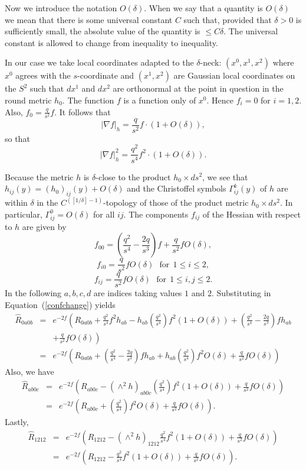 Now we introduce the notation $O(\delta)$. When we say that a
quantity is $O(\delta)$ we mean that there is some universal
constant $C$ such that, provided that $\delta>0$ is sufficiently
small, the absolute value of the quantity is $\le C\delta$. The
universal constant is allowed to change from inequality to
inequality.


In our case we take local coordinates adapted to the $\delta$-neck:
$(x^0,x^1,x^2)$ where $x^0$ agrees with the $s$-coordinate and
$(x^1,x^2)$ are Gaussian local coordinates on the $S^2$ such that
$dx^1$ and $dx^2$ are orthonormal at the point in question in the
round metric $h_0$. The function $f$ is a function only of $x^0$.
Hence $f_i=0$ for $i=1,2$. Also, $f_0=\frac{q}{s^2}f$. It follows
that
$$|\nabla f|_h=\frac{q}{s^2}f\cdot(1+O(\delta)),$$ so that
$$|\nabla
f|_h^2=\frac{q^2}{s^4}f^2\cdot (1+O(\delta)).$$

Because the metric $h$ is $\delta$-close to the product $h_0\times
ds^2$, we see that $h_{ij}(y)=(h_0)_{ij}(y)+O(\delta)$ and the
Christoffel symbols $\Gamma_{ij}^k(y)$ of $h$ are within $\delta$ in
the $C^{([1/\delta]-1)}$-topology of those of the product metric
$h_0\times ds^2$. In particular, $\Gamma_{ij}^0=O(\delta)$ for all
$ij$.
  The components $f_{ij}$ of the Hessian with
respect to $h$ are given by
$$f_{00}=\left(\frac{q^2}{s^4}-\frac{2q}{s^3}\right)f+\frac{q}{s^2}fO(\delta),$$
$$f_{i0}=\frac{q}{s^2}fO(\delta)\ \ \ \mathrm{for}\ \ 1\le i\le 2,$$
$$f_{ij}=\frac{q}{s^2}fO(\delta)\ \ \ \mathrm{for}\ \ 1\le i,j\le 2.$$
In the following $a,b,c,d$ are indices taking values $1$ and $2$.
Substituting in Equation~(\ref{confchange}) yields
\begin{eqnarray*}\hat
R_{0a0b} & = &
e^{-2f}\left(R_{0a0b}+\frac{q^2}{s^4}f^2h_{ab}-h_{ab}(\frac{q^2}{s^4})f^2(1+O(\delta))
+\left(\frac{q^2}{s^4}-\frac{2q}{s^3}\right)fh_{ab} \right. \\
& & \left. +\frac{q}{s^2}fO(\delta)\right)\\
& = &
e^{-2f}\left(R_{0a0b}+\left(\frac{q^2}{s^4}-\frac{2q}{s^3}\right)fh_{ab}+
h_{ab}(\frac{q^2}{s^4})f^2O(\delta)
+\frac{q}{s^2}fO(\delta)\right)\end{eqnarray*} Also, we have
\begin{eqnarray*}\hat
R_{ab0c} & = &
e^{-2f}\left(R_{ab0c}-(\wedge^2h)_{ab0c}(\frac{q^2}{s^4})f^2(1+O(\delta))
+\frac{q}{s^2}fO(\delta)\right) \\
& = & e^{-2f}\left(R_{ab0c}+(\frac{q^2}{s^4})f^2O(\delta)
+\frac{q}{s^2}fO(\delta)\right).\end{eqnarray*}
 Lastly,
\begin{eqnarray*} \hat R_{1212} & = &
e^{-2f}\left(R_{1212}-(\wedge^2h)_{1212}\frac{q^2}{s^4}f^2(1+O(\delta))+\frac{q}{s^2}fO(\delta)\right)
\\
& = &
e^{-2f}\left(R_{1212}-\frac{q^2}{s^4}f^2(1+O(\delta))+\frac{q}{s^2}fO(\delta)\right).
\end{eqnarray*}


